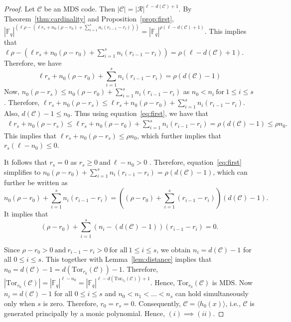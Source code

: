 \documentclass[12pt,a4paper]{article}
\begin{document}
\begin{proof}
    Let $\mathcal{C}$ be an MDS code. Then $|\mathcal{C}|=|\mathcal{R}|^{\ell-d(\mathcal{C})+1}$. By Theorem~\ref{thm:cardinality} and Proposition~\ref{prop:first}, $|\mathbb{F}_q|^{(\ell\rho-(\ell r_s+n_0(\rho-r_0)+\sum_{i=1}^sn_i(r_{i-1}-r_i)))}=|\mathbb{F}_q|^{\rho(\ell-d(\mathcal{C})+1)}$. This implies that ${\ell\rho-(\ell r_s+n_0(\rho-r_0)+\sum_{i=1}^sn_i(r_{i-1}-r_i))}=\rho(\ell-d(\mathcal{C})+1)$. Therefore, we have
    \begin{equation}\label{eq:first}
         \ell r_s+n_0(\rho-r_0)+\sum_{i=1}^sn_i(r_{i-1}-r_i)=\rho(d(\mathcal{C})-1)
    \end{equation}
    Now, $n_0(\rho-r_s) \le n_0(\rho-r_0)+\sum_{i=1}^sn_i(r_{i-1}-r_i)$ as $n_0 < n_i~\text{for}~1 \le i \le s$. Therefore, $\ell r_s+ n_0(\rho-r_s)\le \ell r_s+n_0(\rho-r_0)+\sum_{i=1}^sn_i(r_{i-1}-r_i)$. Also, $d(\mathcal{C})-1 \le n_0$. Thus using equation~\ref{eq:first}, we have that
    \begin{align*}
        \ell r_s+  n_0(\rho-r_s) \le \ell r_s+n_0(\rho-r_0)+\sum_{i=1}^sn_i(r_{i-1}-r_i)=\rho(d(\mathcal{C})-1) \le \rho n_0.
        \end{align*}
       This implies that $\ell r_s+  n_0(\rho-r_s) \le \rho n_0$,
      which further implies that $r_s(\ell-n_0)\le 0$.
    
    It follows that $r_s=0$ as $r_s \ge 0~\text{and}~\ell-n_0>0$ .
    Therefore, equation~\ref{eq:first} simplifies to $n_0(\rho-r_0)+\sum_{i=1}^sn_i(r_{i-1}-r_i)=\rho(d(\mathcal{C})-1)$, which can further be written as
    \begin{equation*}
        n_0(\rho-r_0)+\sum_{i=1}^sn_i(r_{i-1}-r_i)=((\rho-r_0)+\sum_{i=1}^s(r_{i-1}-r_i))(d(\mathcal{C})-1).
    \end{equation*}
    It implies that
    \begin{equation*}
         (\rho-r_0)+\sum_{i=1}^s(n_i-(d(\mathcal{C})-1))(r_{i-1}-r_i)=0.
    \end{equation*}
    
    Since $\rho-r_0>0~\text{and}~r_{i-1}-r_i>0~\text{for all}~1 \le i \le s$, we obtain $n_i=d(\mathcal{C})-1$ for all $0\le i \le s$. This together with Lemma~\ref{lem:distance} implies that $n_0=d(\mathcal{C})-1=d(\mathrm{Tor}_{r_0}(\mathcal{C}))-1$. Therefore, $|\mathrm{Tor}_{r_0}(\mathcal{C})|=|\mathbb{F}_q|^{\ell-n_0}=|\mathbb{F}_q|^{\ell-d(\mathrm{Tor}_{r_0}(\mathcal{C}))+1}$. Hence, $\mathrm{Tor}_{r_0}(\mathcal{C})$ is MDS. Now $n_i=d(\mathcal{C})-1$ for all $0\le i \le s$ and $n_0<n_1<\dots <n_s$ can hold simultaneously only when $s$ is zero. Therefore, $r_0=r_s=0$. Consequently, $\mathcal{C}=\langle h_0(x) \rangle$, i.e., $\mathcal{C}$ is generated principally by a monic polynomial. Hence, $(i) \implies(ii)$.


\end{proof}
\end{document}
